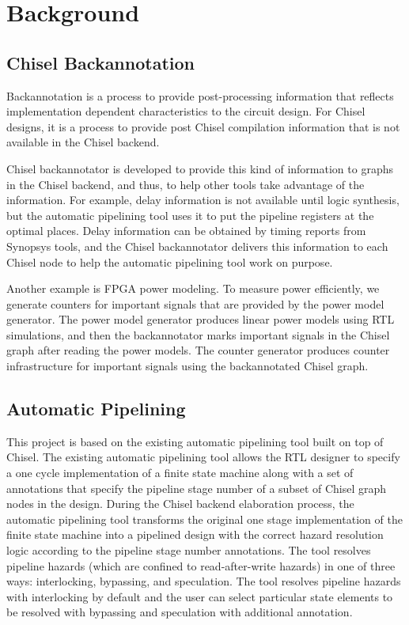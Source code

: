 \section{Background}
\subsection{Chisel Backannotation}
Backannotation is a process to provide post-processing information that reflects implementation dependent characteristics to the circuit design. For Chisel designs, it is a process to provide post Chisel compilation information that is not available in the Chisel backend.

Chisel backannotator is developed to provide this kind of information to graphs in the Chisel backend, and thus, to help other tools take advantage of the information. For example, delay information is not available until logic synthesis, but the automatic pipelining tool uses it to put the pipeline registers at the optimal places. Delay information can be obtained by timing reports from Synopsys tools, and the Chisel backannotator delivers this information to each Chisel node to help the automatic pipelining tool work on purpose.

Another example is FPGA power modeling. To measure power efficiently, we generate counters for important signals that are provided by the power model generator. The power model generator produces linear power models using RTL simulations, and then the backannotator marks important signals in the Chisel graph after reading the power models. The counter generator produces counter infrastructure for important signals using the backannotated Chisel graph.

\subsection{Automatic Pipelining}
\label{sec:related-work}
This project is based on the existing automatic pipelining tool built on top of Chisel\cite{Bachrach:2012}. The existing automatic pipelining tool allows the RTL designer to specify a one cycle implementation of a finite state machine along with a set of annotations that specify the pipeline stage number of a subset of Chisel graph nodes in the design. During the Chisel backend elaboration process, the automatic pipelining tool transforms the original one stage implementation of the finite state machine into a pipelined design with the correct hazard resolution logic according to the pipeline stage number annotations. The tool resolves pipeline hazards (which are confined to read-after-write hazards) in one of three ways: interlocking, bypassing, and speculation. The tool resolves pipeline hazards with interlocking by default and the user can select particular state elements to be resolved with bypassing and speculation with additional annotation.

